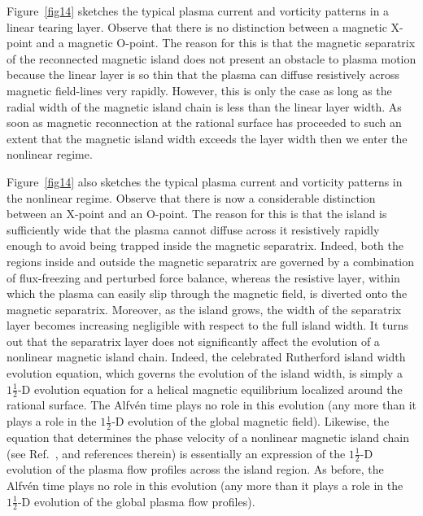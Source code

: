 \documentclass[12pt,prb,aps]{revtex4-1}
\begin{document}
 Figure~\ref{fig14} sketches the typical plasma current and vorticity patterns in a linear tearing layer. Observe that there is
 no distinction between a magnetic X-point and a magnetic 
O-point. The reason for this is that the magnetic separatrix
of the reconnected magnetic island does not present an obstacle
to plasma motion because the linear layer is so thin that the
plasma can diffuse resistively across magnetic field-lines very rapidly. However, this is only the case as long
as the radial width of the magnetic island chain is less than the linear layer width. As soon as magnetic reconnection
at the rational surface has proceeded to such an extent that
the magnetic island width exceeds the layer width then we enter the nonlinear regime. 

Figure~\ref{fig14} also sketches the
typical plasma current and vorticity patterns in the nonlinear regime. Observe that there is now a considerable distinction between an X-point and an O-point. The reason for this is that the island is sufficiently wide that the plasma cannot diffuse across it resistively rapidly enough to
avoid being trapped inside the magnetic separatrix. Indeed, both the regions inside and outside the magnetic separatrix
are governed by a combination of flux-freezing and perturbed force balance, whereas the resistive
layer, within which the plasma can easily slip through the magnetic field,  is diverted onto the magnetic separatrix. Moreover, as
the island grows, the width of the separatrix layer becomes
increasing negligible with respect to the full island width. It
turns out that the separatrix layer does not significantly affect the evolution of a nonlinear magnetic island chain. Indeed,
the celebrated Rutherford island width evolution equation,
which governs the evolution of the island width, is simply a
$1\tfrac{1}{2}$-D evolution equation for a helical magnetic
equilibrium localized around the rational surface.\cite{ruth}
The Alfv\'{e}n time plays no role in this evolution (any more
than it plays a role in the $1\tfrac{1}{2}$-D evolution of
the global magnetic field). Likewise, the equation that
determines the phase velocity of a nonlinear magnetic island chain (see Ref.~, and references therein) is essentially an
expression of the $1\tfrac{1}{2}$-D evolution of the plasma
flow profiles across the island region. As before, the  Alfv\'{e}n time plays no role in this evolution (any more
than it plays a role in the $1\tfrac{1}{2}$-D evolution of
the global plasma flow profiles). 
\end{document}

